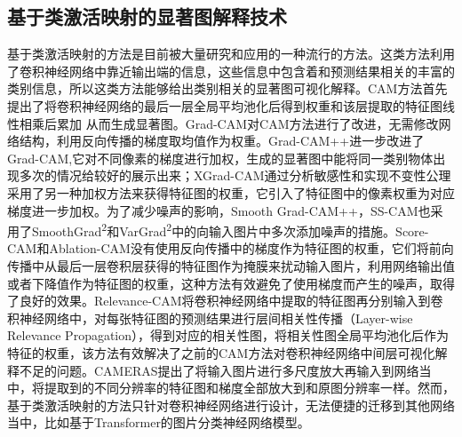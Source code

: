 \subsection{基于类激活映射的显著图解释技术}
基于类激活映射的方法是目前被大量研究和应用的一种流行的方法。这类方法利用了卷积神经网络中靠近输出端的信息，这些信息中包含着和预测结果相关的丰富的类别信息，所以这类方法能够给出类别相关的显著图可视化解释。CAM\textsuperscript{\cite{zhou2016learning}}方法首先提出了将卷积神经网络的最后一层全局平均池化后得到权重和该层提取的特征图线性相乘后累加  从而生成显著图。Grad-CAM\textsuperscript{\cite{selvaraju2017grad}}对CAM方法进行了改进，无需修改网络结构，利用反向传播的梯度取均值作为权重。Grad-CAM++\textsuperscript{\cite{chattopadhay2018grad}}进一步改进了Grad-CAM,它对不同像素的梯度进行加权，生成的显著图中能将同一类别物体出现多次的情况给较好的展示出来；XGrad-CAM\textsuperscript{\cite{fu2020axiom}}通过分析敏感性和实现不变性公理采用了另一种加权方法来获得特征图的权重，它引入了特征图中的像素权重为对应梯度进一步加权。为了减少噪声的影响，Smooth Grad-CAM++\textsuperscript{\cite{omeiza2019smooth}}，SS-CAM\textsuperscript{\cite{wang2020ss}}也采用了SmoothGrad\textsuperscript{\cite{smilkov2017smoothgrad}2}和VarGrad\textsuperscript{\cite{adebayo2018sanity}2}中的向输入图片中多次添加噪声的措施。Score-CAM\textsuperscript{\cite{wang2020score}}和Ablation-CAM\textsuperscript{\cite{ramaswamy2020ablation}}没有使用反向传播中的梯度作为特征图的权重，它们将前向传播中从最后一层卷积层获得的特征图作为掩膜来扰动输入图片，利用网络输出值或者下降值作为特征图的权重，这种方法有效避免了使用梯度而产生的噪声，取得了良好的效果。Relevance-CAM\textsuperscript{\cite{lee2021relevance}}将卷积神经网络中提取的特征图再分别输入到卷积神经网络中，对每张特征图的预测结果进行层间相关性传播（Layer-wise Relevance Propagation），得到对应的相关性图，将相关性图全局平均池化后作为特征的权重，该方法有效解决了之前的CAM方法对卷积神经网络中间层可视化解释不足的问题。CAMERAS\textsuperscript{\cite{jalwana2021cameras}}提出了将输入图片进行多尺度放大再输入到网络当中，将提取到的不同分辨率的特征图和梯度全部放大到和原图分辨率一样。然而，基于类激活映射的方法只针对卷积神经网络进行设计，无法便捷的迁移到其他网络当中，比如基于Transformer的图片分类神经网络模型。


